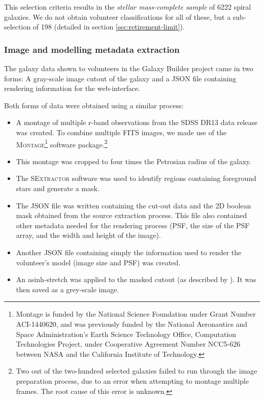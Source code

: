 \documentclass[../main.tex]{subfiles}
\begin{document}
This selection criteria results in the \textit{stellar mass-complete sample} of 6222 spiral galaxies. We do not obtain volunteer classifications for all of these, but a sub-selection of 198 (detailed in section \ref{sec:retirement-limit}).

\subsubsection{Image and modelling metadata extraction}

The galaxy data shown to volunteers in the Galaxy Builder project came in two forms: A gray-scale image cutout of the galaxy and a JSON file containing rendering information for the web-interface.

Both forms of data were obtained using a similar process:

\begin{itemize}
\item A montage of multiple r-band observations from the SDSS DR13 data release was created. To combine multiple FITS images, we made use of the \textsc{Montage}\footnote{Montage is funded by the National Science Foundation under Grant Number ACI-1440620, and was previously funded by the National Aeronautics and Space Administration's Earth Science Technology Office, Computation Technologies Project, under Cooperative Agreement Number NCC5-626 between NASA and the California Institute of Technology.} software package.\footnote{Two out of the two-hundred selected galaxies failed to run through the image preparation process, due to an error when attempting to montage multiple frames. The root cause of this error is unknown.}
\item This montage was cropped to four times the Petrosian radius of the galaxy.
\item The \textsc{SExtractor} software \citep{source-extractor} was used to identify regions containing foreground stars and generate a mask.
\item The JSON file was written containing the cut-out data and the 2D boolean mask obtained from the source extraction process. This file also contained other metadata needed for the rendering process (PSF, the size of the PSF array, and the width and height of the image).
\item Another JSON file containing simply the information used to render the volunteer's model (image size and PSF) was created.
\item An asinh-stretch was applied to the masked cutout (as described by \citealt{Lupton2003:astro-ph/0312483v1}). It was then saved as a grey-scale image.
\end{itemize}
\end{document}
